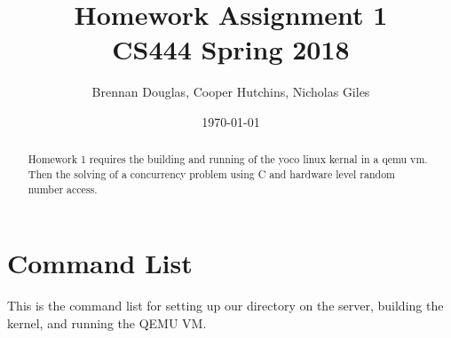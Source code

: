 \documentclass[onecolumn, draftclsnofoot,10pt, compsoc]{IEEEtran}
\title{Homework Assignment 1\\\large CS444 Spring 2018}
\author{Brennan Douglas, Cooper Hutchins, Nicholas Giles}
\date{\today}
\begin{document}
\begin{titlingpage}
			\maketitle
      \begin{abstract}
			\noindent Homework 1 requires the building and running of the yoco linux kernal in a qemu vm.  Then the solving of a concurrency problem using C and hardware level random number access.
      \end{abstract}
\end{titlingpage}

\newpage
{}

\clearpage
\singlespace


\section{Command List}

This is the command list for setting up our directory on the server, building the kernel, and running the QEMU VM.
\end{document}
